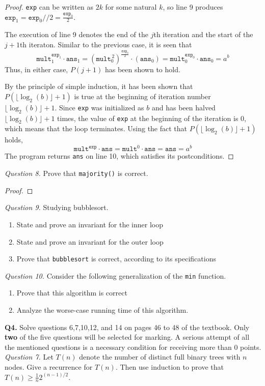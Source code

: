 \documentclass[11pt]{article}
\begin{document}
\begin{enumerate}[label=(\alph*)]
\begin{proof}
            \verb|exp| can be written as \(2k\) for some natural \(k\), so line 9 produces \(\texttt{exp}_1 = \texttt{exp}_0 // 2 = \frac{\texttt{exp}_0}{2}\).

            The execution of line 9 denotes the end of the \(j\)th iteration and the start of the \(j+1\)th iteraton. Similar to the previous case, it is seen that 
            \[
                \texttt{mult}_1^{\texttt{exp}_1} \cdot \texttt{ans}_1 = (\texttt{mult}_0^{\, 2})^\frac{\texttt{exp}_0}{2} \cdot (\texttt{ans}_0) = \texttt{mult}_0^{\texttt{exp}_0} \cdot \texttt{ans}_0 = a^b
            \]
            Thus, in either case, \(P(j+1)\) has been shown to hold.

            By the principle of simple induction, it has been shown that \(P(\lfloor \log _2(b) \rfloor + 1)\) is true at the beginning of iteration number \(\lfloor \log _2(b) \rfloor + 1\). Since \verb|exp| was initialized as \(b\) and has been halved \(\lfloor \log _2(b) \rfloor + 1\) times, the value of \verb|exp| at the beginning of the iteration is 0, which means that the loop terminates. Using the fact that \(P(\lfloor \log _2(b) \rfloor + 1)\) holds,
            \[
                \texttt{mult}^\texttt{exp} \cdot \texttt{ans} = \texttt{mult}^0 \cdot \texttt{ans} = \texttt{ans} = a^b
            \]
            The program returns \verb|ans| on line 10, which satisfies its postconditions.
        \end{proof}
    \end{enumerate}
    \textit{Question 8.} Prove that \verb|majority()| is correct.
    \begin{proof}
        
    \end{proof}
    \textit{Question 9.} Studying bubblesort.
    \begin{enumerate}[label=(\alph*)]
        \item State and prove an invariant for the inner loop
        \item State and prove an invariant for the outer loop
        \item Prove that \verb|bubblesort| is correct, according to its specifications
    \end{enumerate}
    \textit{Question 10.} Consider the following generalization of the \verb|min| function.
    \begin{enumerate}[label=(\alph*)]
        \item Prove that this algorithm is correct
        \item Analyze the worse-case running time of this algorithm.
    \end{enumerate}
    \pagebreak
    \textbf{Q4.} Solve questions 6,7,10,12, and 14 on pages 46 to 48 of the textbook. Only \textbf{two} of the five questions will be selected for marking. A serious attempt of all the mentioned questions is a necessary condition for receiving more than 0 points.
    \textit{Question 7.} Let \(T(n)\) denote the number of distinct full binary trees with \(n\) nodes. Give a recurrence for \(T(n)\). Then use induction to prove that \(T(n)\geq \frac{1}{n}2^{(n-1) / 2}\).
\end{document}
